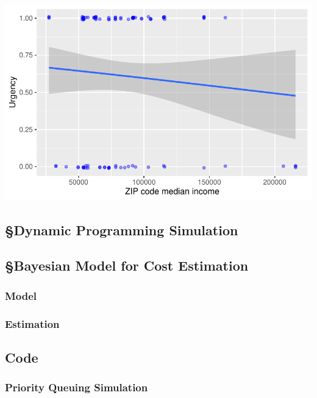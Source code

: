 \includegraphics{thesis-file-ppq_files/figure-latex/img-urg-pca-4.pdf}

\hypertarget{dynamic-programming-simulation}{%
\subsection{§Dynamic Programming
Simulation}\label{dynamic-programming-simulation}}

\hypertarget{bayesian-model-for-cost-estimation}{%
\subsection{§Bayesian Model for Cost
Estimation}\label{bayesian-model-for-cost-estimation}}

\hypertarget{model}{%
\subsubsection{Model}\label{model}}

\hypertarget{estimation}{%
\subsubsection{Estimation}\label{estimation}}

\hypertarget{code}{%
\subsection{Code}\label{code}}

\hypertarget{priority-queuing-simulation}{%
\subsubsection{Priority Queuing
Simulation}\label{priority-queuing-simulation}}

